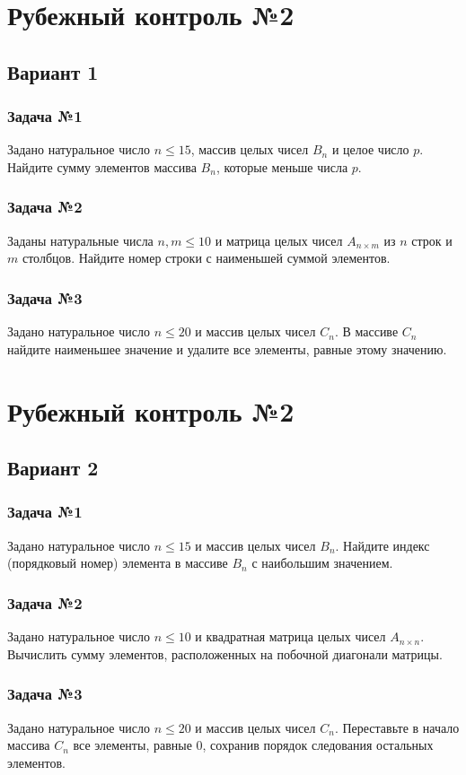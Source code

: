 \documentclass[12pt,a5paper,landscape]{report}
\begin{document}
\parindent=1cm
\pagestyle{empty}

\clearpage
\section*{Рубежный контроль №2}
\subsection*{Вариант 1}
\subsubsection*{Задача №1}
Задано натуральное число $n \le 15$, массив целых чисел $B_n$ и целое число $p$. Найдите сумму элементов массива $B_n$, которые меньше числа $p$.
\subsubsection*{Задача №2}
Заданы натуральные числа $n, m \le 10$ и матрица целых чисел $A_{n \times m}$ из $n$ строк и $m$ столбцов. Найдите номер строки с наименьшей суммой элементов.
\subsubsection*{Задача №3}
Задано натуральное число $n \le 20$ и массив целых чисел $C_n$. В массиве $C_n$ найдите наименьшее значение и удалите все элементы, равные этому значению.


\clearpage
\section*{Рубежный контроль №2}
\subsection*{Вариант 2}
\subsubsection*{Задача №1}
Задано натуральное число $n \le 15$ и массив целых чисел $B_n$. Найдите индекс (порядковый номер) элемента в массиве $B_n$ с наибольшим значением.
\subsubsection*{Задача №2}
Задано натуральное число $n \le 10$ и квадратная матрица целых чисел $A_{n \times n}$. Вычислить сумму элементов, расположенных на побочной диагонали матрицы.
\subsubsection*{Задача №3}
Задано натуральное число $n \le 20$ и массив целых чисел $C_n$. Переставьте в начало массива $C_n$ все элементы, равные $0$, сохранив порядок следования остальных элементов.
\end{document}
